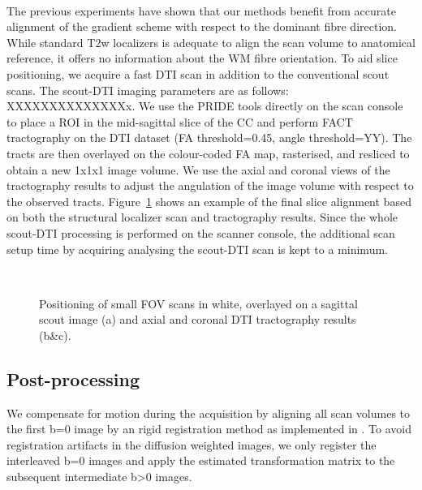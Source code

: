 \paragraph{}
The previous experiments have shown that our \SF{} methods benefit from accurate alignment of the gradient scheme with respect to the dominant fibre direction. While standard T2w localizers is adequate to align the scan volume to anatomical reference, it offers no information about the WM fibre orientation. To aid slice positioning, we acquire a fast DTI scan in addition to the conventional scout scans. The scout-DTI imaging parameters are as follows: XXXXXXXXXXXXXXx. We use the PRIDE tools directly on the scan console to place a ROI in the mid-sagittal slice of the CC and perform FACT tractography on the DTI dataset (FA threshold=0.45, angle threshold=YY). The tracts are then overlayed on the colour-coded FA map, rasterised, and resliced to obtain a new 1x1x1 image volume. We use the axial and coronal views of the tractography results to adjust the angulation of the \SF{} image volume with respect to the observed tracts.  Figure~\ref{fig:chap9 FOV positioning} shows an example of the final slice alignment based on both the structural localizer scan and tractography results. Since the whole scout-DTI processing is performed on the scanner console, the additional scan setup time by acquiring analysing the scout-DTI scan is kept to a minimum.

\begin{figure}[ht]
	\centering
	\begin{minipage}{0.35\textwidth}
	\\
	\end{minipage}\hspace{0.05\textwidth}
	\begin{minipage}{0.53\textwidth}
	\end{minipage}
	
	\caption{Positioning of small FOV scans in white, overlayed on a sagittal scout image (a) and axial and coronal DTI tractography results (b\&c).}
	\label{fig:chap9 FOV positioning}	
\end{figure}
\subsection*{Post-processing}
We compensate for motion during the acquisition by aligning all scan volumes to the first b=0 image by an rigid registration method\cite{XX} as implemented in \cite{niftyreg}. To avoid registration artifacts in the diffusion weighted images, we only register the interleaved b=0 images and apply the estimated transformation matrix to the subsequent intermediate b>0 images.   

